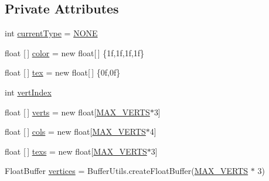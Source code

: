 \subsection*{Private Attributes}
\begin{DoxyCompactItemize}
\item 
int \mbox{\hyperlink{classorg_1_1newdawn_1_1slick_1_1opengl_1_1renderer_1_1_v_a_o_g_l_renderer_a6cadd666fe4784228fbede01e76c6734}{current\+Type}} = \mbox{\hyperlink{classorg_1_1newdawn_1_1slick_1_1opengl_1_1renderer_1_1_v_a_o_g_l_renderer_a3344bc9e570edaaaf4ee44af3b73f32a}{N\+O\+NE}}
\item 
float \mbox{[}$\,$\mbox{]} \mbox{\hyperlink{classorg_1_1newdawn_1_1slick_1_1opengl_1_1renderer_1_1_v_a_o_g_l_renderer_aff2f26ed4c579285e854a123093f3315}{color}} = new float\mbox{[}$\,$\mbox{]} \{1f,1f,1f,1f\}
\item 
float \mbox{[}$\,$\mbox{]} \mbox{\hyperlink{classorg_1_1newdawn_1_1slick_1_1opengl_1_1renderer_1_1_v_a_o_g_l_renderer_a83feee944281be5b53b0f654df3e84f5}{tex}} = new float\mbox{[}$\,$\mbox{]} \{0f,0f\}
\item 
int \mbox{\hyperlink{classorg_1_1newdawn_1_1slick_1_1opengl_1_1renderer_1_1_v_a_o_g_l_renderer_a04b3aeb5aa19f464215aafe532cf4d24}{vert\+Index}}
\item 
float \mbox{[}$\,$\mbox{]} \mbox{\hyperlink{classorg_1_1newdawn_1_1slick_1_1opengl_1_1renderer_1_1_v_a_o_g_l_renderer_adb5d9bf13cdc6871cf650573aded4ed3}{verts}} = new float\mbox{[}\mbox{\hyperlink{classorg_1_1newdawn_1_1slick_1_1opengl_1_1renderer_1_1_v_a_o_g_l_renderer_ada536ce7ada01eb56efbcb3e883c2b3f}{M\+A\+X\+\_\+\+V\+E\+R\+TS}}$\ast$3\mbox{]}
\item 
float \mbox{[}$\,$\mbox{]} \mbox{\hyperlink{classorg_1_1newdawn_1_1slick_1_1opengl_1_1renderer_1_1_v_a_o_g_l_renderer_a0cd87782dbab5cdc4f83d3bf15b44388}{cols}} = new float\mbox{[}\mbox{\hyperlink{classorg_1_1newdawn_1_1slick_1_1opengl_1_1renderer_1_1_v_a_o_g_l_renderer_ada536ce7ada01eb56efbcb3e883c2b3f}{M\+A\+X\+\_\+\+V\+E\+R\+TS}}$\ast$4\mbox{]}
\item 
float \mbox{[}$\,$\mbox{]} \mbox{\hyperlink{classorg_1_1newdawn_1_1slick_1_1opengl_1_1renderer_1_1_v_a_o_g_l_renderer_a183ba1cb5d3fcdfcfabf404508170874}{texs}} = new float\mbox{[}\mbox{\hyperlink{classorg_1_1newdawn_1_1slick_1_1opengl_1_1renderer_1_1_v_a_o_g_l_renderer_ada536ce7ada01eb56efbcb3e883c2b3f}{M\+A\+X\+\_\+\+V\+E\+R\+TS}}$\ast$3\mbox{]}
\item 
Float\+Buffer \mbox{\hyperlink{classorg_1_1newdawn_1_1slick_1_1opengl_1_1renderer_1_1_v_a_o_g_l_renderer_aceca843be4312bc056c29a3911457e2f}{vertices}} = Buffer\+Utils.\+create\+Float\+Buffer(\mbox{\hyperlink{classorg_1_1newdawn_1_1slick_1_1opengl_1_1renderer_1_1_v_a_o_g_l_renderer_ada536ce7ada01eb56efbcb3e883c2b3f}{M\+A\+X\+\_\+\+V\+E\+R\+TS}} $\ast$ 3)

\end{DoxyCompactItemize}
